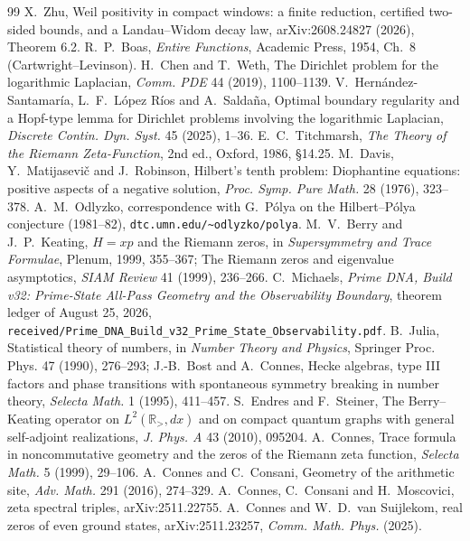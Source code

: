 \documentclass[11pt]{article}
\theoremstyle{definition}
\theoremstyle{remark}
\begin{document}
\begin{thebibliography}{99}
 X.~Zhu, Weil positivity in compact windows: a finite reduction, certified two-sided bounds, and a Landau--Widom decay law, arXiv:2608.24827 (2026), Theorem 6.2.
 R.~P.~Boas, \emph{Entire Functions}, Academic Press, 1954, Ch.\ 8 (Cartwright--Levinson).
 H.~Chen and T.~Weth, The Dirichlet problem for the logarithmic Laplacian, \emph{Comm. PDE} 44 (2019), 1100--1139.
 V.~Hern\'andez-Santamar\'ia, L.~F.~L\'opez R\'ios and A.~Salda\~na, Optimal boundary regularity and a Hopf-type lemma for Dirichlet problems involving the logarithmic Laplacian, \emph{Discrete Contin. Dyn. Syst.} 45 (2025), 1--36.
 E.~C.~Titchmarsh, \emph{The Theory of the Riemann Zeta-Function}, 2nd ed., Oxford, 1986, \S14.25.
 M.~Davis, Y.~Matijasevi\v c and J.~Robinson, Hilbert's tenth problem: Diophantine equations: positive aspects of a negative solution, \emph{Proc. Symp. Pure Math.} 28 (1976), 323--378.
 A.~M.~Odlyzko, correspondence with G.~P\'olya on the Hilbert--P\'olya conjecture (1981--82), \texttt{dtc.umn.edu/\textasciitilde odlyzko/polya}.
 M.~V.~Berry and J.~P.~Keating, $H=xp$ and the Riemann zeros, in \emph{Supersymmetry and Trace Formulae}, Plenum, 1999, 355--367; The Riemann zeros and eigenvalue asymptotics, \emph{SIAM Review} 41 (1999), 236--266.
 C.~Michaels, \emph{Prime DNA, Build v32: Prime-State All-Pass Geometry and the Observability Boundary}, theorem ledger of August 25, 2026, \texttt{received/Prime\_DNA\_Build\_v32\_Prime\_State\_Observability.pdf}.
 B.~Julia, Statistical theory of numbers, in \emph{Number Theory and Physics}, Springer Proc. Phys. 47 (1990), 276--293; J.-B.~Bost and A.~Connes, Hecke algebras, type III factors and phase transitions with spontaneous symmetry breaking in number theory, \emph{Selecta Math.} 1 (1995), 411--457.
 S.~Endres and F.~Steiner, The Berry--Keating operator on $L^2(\mathbb R_>,dx)$ and on compact quantum graphs with general self-adjoint realizations, \emph{J. Phys. A} 43 (2010), 095204.
 A.~Connes, Trace formula in noncommutative geometry and the zeros of the Riemann zeta function, \emph{Selecta Math.} 5 (1999), 29--106.
 A.~Connes and C.~Consani, Geometry of the arithmetic site, \emph{Adv. Math.} 291 (2016), 274--329.
 A.~Connes, C.~Consani and H.~Moscovici, zeta spectral triples, arXiv:2511.22755.
 A.~Connes and W.~D.~van Suijlekom, real zeros of even ground states, arXiv:2511.23257, \emph{Comm. Math. Phys.} (2025).

\end{thebibliography}
\end{document}
